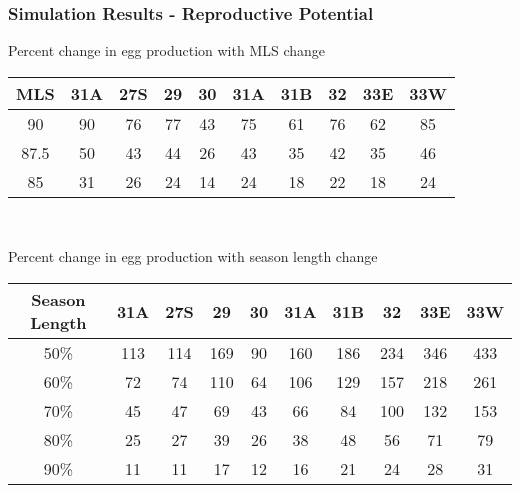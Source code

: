 \documentclass{beamer}
\newcommand{\ebh}{\string~/bio.data/bio.lobster/figures/LFA2733Framework2018/} %
\begin{document}




\begin{frame}
\frametitle{Simulation Results - Reproductive Potential}
Percent change in egg production with MLS change 
\centering
\begin{tabular}{|c|c|c|c|c|c|c|c|c|c|}
\hline
MLS & 31A & 27S & 29 & 30 & 31A & 31B & 32 & 33E & 33W \\
\hline
90 & 90 & 76 & 77 & 43 & 75 & 61 & 76 & 62 & 85 \\
\hline
87.5 & 50 & 43 & 44 & 26 & 43 & 35 & 42 & 35 & 46 \\
\hline
85 & 31 & 26 & 24 & 14 & 24 & 18 & 22 & 18 & 24 \\
\hline
 
\end{tabular}\\

\vspace{5mm}

Percent change in egg production with season length change 
\centering
\begin{tabular}{|c|c|c|c|c|c|c|c|c|c|}
\hline
Season Length & 31A & 27S & 29 & 30 & 31A & 31B & 32 & 33E & 33W \\
\hline
50\% & 113 & 114 & 169 & 90 & 160 & 186 & 234 & 346 & 433 \\
\hline
60\% & 72  & 74  & 110 & 64 & 106 & 129 & 157 & 218 & 261 \\
\hline
70\% & 45  & 47  & 69  & 43 & 66  & 84  & 100 & 132 & 153 \\
\hline
80\% & 25  & 27  & 39  & 26 & 38  & 48  & 56  & 71  & 79  \\
\hline
90\% & 11  & 11  & 17  & 12 & 16  & 21  & 24  & 28  & 31  \\
\hline
 
\end{tabular}
\end{frame}
\end{document}
